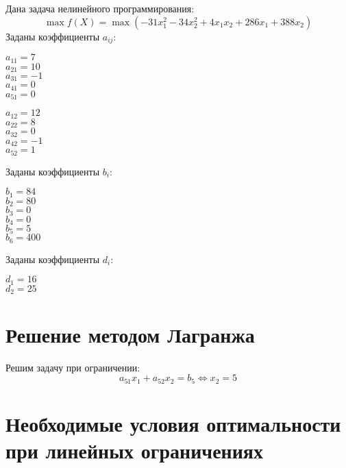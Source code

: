 Дана задача нелинейного программирования:
\begin{equation*}
	\max f(X) = \max \left( -31 x_1^2 - 34 x_2^2 + 4 x_1 x_2 + 286 x_1 + 388 x_2 \right)
\end{equation*}
Заданы коэффициенты $a_{ij}$:
\begin{center}
\begin{multicols}{5}
	$a_{11} = 7$\\
	$a_{21} = 10$\\
	$a_{31} = -1$\\
	$a_{41} = 0$\\
	$a_{51} = 0$\\
\end{multicols}
\begin{multicols}{5}
	$a_{12} = 12$\\
	$a_{22} = 8$\\
	$a_{32} = 0$\\
	$a_{42} = -1$\\
	$a_{52} = 1$\\
\end{multicols}
\end{center}
Заданы коэффициенты $b_i$:
\begin{multicols}{6}
	\centering
	$b_1 = 84$\\
	$b_2 = 80$\\
	$b_3 = 0$\\
	$b_4 = 0$\\
	$b_5 = 5$\\
	$b_6 = 400$\\
\end{multicols}
\noindent Заданы коэффициенты $d_i$:
\begin{multicols}{2}
	\centering
	$d_1 = 16$\\
	$d_2 = 25$\\
\end{multicols}

\section{Решение методом Лагранжа}

Решим задачу при ограничении:
\begin{equation*}
a_{51} x_1 + a_{52} x_2 = b_5 
\Longleftrightarrow
x_2 = 5
\end{equation*}

\section{Необходимые условия оптимальности при линейных ограничениях}

